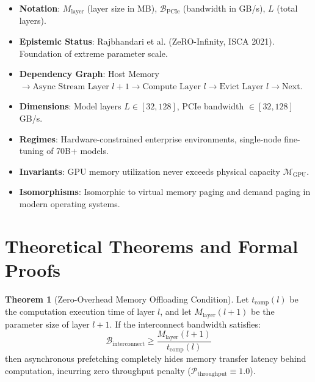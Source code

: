 \documentclass[11pt,a4paper]{article}
\theoremstyle{definition}
\newtheorem{theorem}{\textbf{Theorem}}[section]
\begin{document}
\begin{itemize}
    \item \textbf{Notation}: $M_{\text{layer}}$ (layer size in MB), $\mathcal{B}_{\text{PCIe}}$ (bandwidth in GB/s), $L$ (total layers).
    \item \textbf{Epistemic Status}: Rajbhandari et al. (ZeRO-Infinity, ISCA 2021). Foundation of extreme parameter scale.
    \item \textbf{Dependency Graph}: Host Memory $\to \text{Async Stream Layer } l+1 \to \text{Compute Layer } l \to \text{Evict Layer } l \to \text{Next}$.
    \item \textbf{Dimensions}: Model layers $L \in [32, 128]$, PCIe bandwidth $\in [32, 128]$ GB/s.
    \item \textbf{Regimes}: Hardware-constrained enterprise environments, single-node fine-tuning of 70B+ models.
    \item \textbf{Invariants}: GPU memory utilization never exceeds physical capacity $\mathcal{M}_{\text{GPU}}$.
    \item \textbf{Isomorphisms}: Isomorphic to virtual memory paging and demand paging in modern operating systems.
\end{itemize}

\section{Theoretical Theorems and Formal Proofs}

\begin{theorem}[Zero-Overhead Memory Offloading Condition]
Let $t_{\text{comp}}(l)$ be the computation execution time of layer $l$, and let $M_{\text{layer}}(l+1)$ be the parameter size of layer $l+1$. If the interconnect bandwidth satisfies:
{\boldmath
\begin{equation}
\mathcal{B}_{\text{interconnect}} \ge \frac{M_{\text{layer}}(l+1)}{t_{\text{comp}}(l)}
\end{equation}
}
then asynchronous prefetching completely hides memory transfer latency behind computation, incurring zero throughput penalty ($\mathcal{P}_{\text{throughput}} \equiv 1.0$).
\end{theorem}
\end{document}
